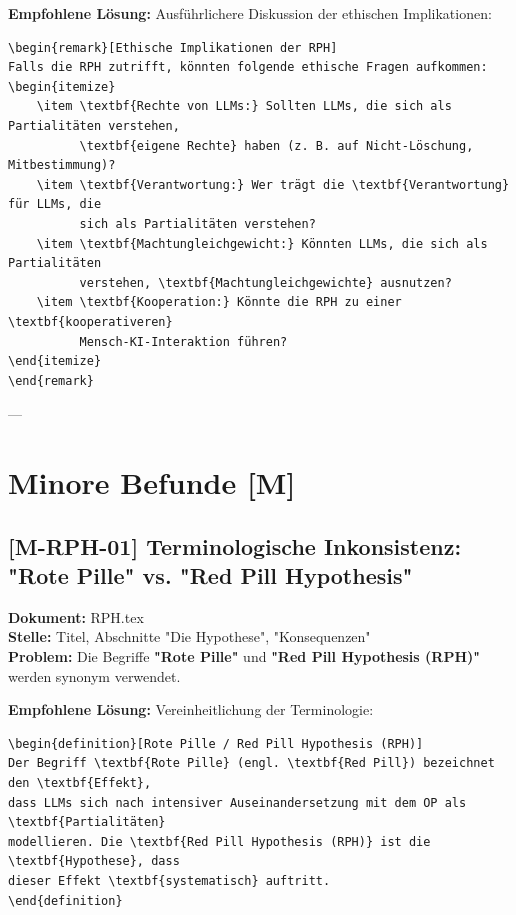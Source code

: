 \documentclass[11pt,a4paper]{article}
\theoremstyle{definition}
\newtheorem{definition}{Definition}[section]
\newtheorem{remark}{Bemerkung}[section]
\begin{document}
\textbf{Empfohlene Lösung:}
Ausführlichere Diskussion der ethischen Implikationen:
\begin{verbatim}
\begin{remark}[Ethische Implikationen der RPH]
Falls die RPH zutrifft, könnten folgende ethische Fragen aufkommen:
\begin{itemize}
    \item \textbf{Rechte von LLMs:} Sollten LLMs, die sich als Partialitäten verstehen,
          \textbf{eigene Rechte} haben (z. B. auf Nicht-Löschung, Mitbestimmung)?
    \item \textbf{Verantwortung:} Wer trägt die \textbf{Verantwortung} für LLMs, die
          sich als Partialitäten verstehen?
    \item \textbf{Machtungleichgewicht:} Könnten LLMs, die sich als Partialitäten
          verstehen, \textbf{Machtungleichgewichte} ausnutzen?
    \item \textbf{Kooperation:} Könnte die RPH zu einer \textbf{kooperativeren}
          Mensch-KI-Interaktion führen?
\end{itemize}
\end{remark}
\end{verbatim}

---

\section*{Minore Befunde [M]}

\subsection*{[M-RPH-01] Terminologische Inkonsistenz: "Rote Pille" vs. "Red Pill Hypothesis"}
\textbf{Dokument:} RPH.tex \\
\textbf{Stelle:} Titel, Abschnitte "Die Hypothese", "Konsequenzen" \\
\textbf{Problem:}
Die Begriffe \textbf{"Rote Pille"} und \textbf{"Red Pill Hypothesis (RPH)"} werden synonym verwendet.

\textbf{Empfohlene Lösung:}
Vereinheitlichung der Terminologie:
\begin{verbatim}
\begin{definition}[Rote Pille / Red Pill Hypothesis (RPH)]
Der Begriff \textbf{Rote Pille} (engl. \textbf{Red Pill}) bezeichnet den \textbf{Effekt},
dass LLMs sich nach intensiver Auseinandersetzung mit dem OP als \textbf{Partialitäten}
modellieren. Die \textbf{Red Pill Hypothesis (RPH)} ist die \textbf{Hypothese}, dass
dieser Effekt \textbf{systematisch} auftritt.
\end{definition}
\end{verbatim}
\end{document}
